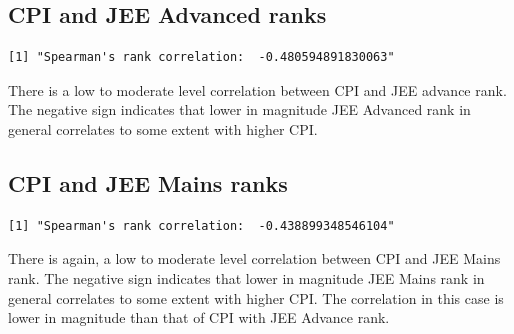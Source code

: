 \documentclass[
  letterpaper,
  DIV=11,
  numbers=noendperiod]{scrartcl}
\begin{document}
\hypertarget{cpi-and-jee-advanced-ranks}{%
\subsection{CPI and JEE Advanced
ranks}\label{cpi-and-jee-advanced-ranks}}

\begin{verbatim}
[1] "Spearman's rank correlation:  -0.480594891830063"
\end{verbatim}

There is a low to moderate level correlation between CPI and JEE advance
rank. The negative sign indicates that lower in magnitude JEE Advanced
rank in general correlates to some extent with higher CPI.

\hypertarget{cpi-and-jee-mains-ranks}{%
\subsection{CPI and JEE Mains ranks}\label{cpi-and-jee-mains-ranks}}

\begin{verbatim}
[1] "Spearman's rank correlation:  -0.438899348546104"
\end{verbatim}

There is again, a low to moderate level correlation between CPI and JEE
Mains rank. The negative sign indicates that lower in magnitude JEE
Mains rank in general correlates to some extent with higher CPI. The
correlation in this case is lower in magnitude than that of CPI with JEE
Advance rank.
\end{document}
